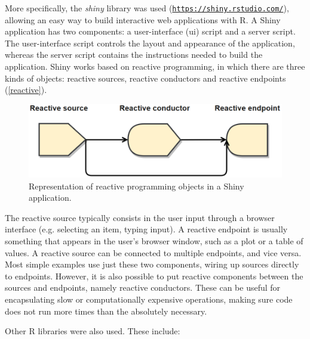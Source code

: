 More specifically, the \textit{shiny} library was used (\href{https://shiny.rstudio.com/}{\nolinkurl{https://shiny.rstudio.com/}}), allowing an easy way to build interactive web applications with R. A Shiny application has two components: a user-interface (ui) script and a server script. The user-interface script controls the layout and appearance of the application, whereas the server script contains the instructions needed to build the application. Shiny works based on reactive programming, in which there are three kinds of objects: reactive sources, reactive conductors and reactive endpoints (\autoref{reactive}).

\begin{figure}[h]
	\centering
	\includegraphics[width=0.7\linewidth]{Imagens/reactive}
	\caption{Representation of reactive programming objects in a Shiny application.}
	\label{reactive}
\end{figure}

The reactive source typically consists in the user input through a browser interface (e.g. selecting an item, typing input). A reactive endpoint is usually something that appears in the user's browser window, such as a plot or a table of values. A reactive source can be connected to multiple endpoints, and vice versa. Most simple examples use just these two components, wiring up sources directly to endpoints. However, it is also possible to put reactive components between the sources and endpoints, namely reactive conductors. These can be useful for encapsulating slow or computationally expensive operations, making sure code does not run more times than the absolutely necessary.

Other R libraries were also used. These include:

